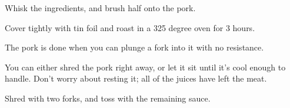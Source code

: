 \begin{recipe}
Whisk the ingredients, and brush half onto the pork.

Cover tightly with tin foil and roast in a 325 degree oven for 3 hours.

The pork is done when you can plunge a fork into it with no resistance.

You can either shred the pork right away, or let it sit until it's cool enough to handle. Don't worry about resting it; all of the juices have left the meat.

Shred with two forks, and toss with the remaining sauce.

\end{recipe}
